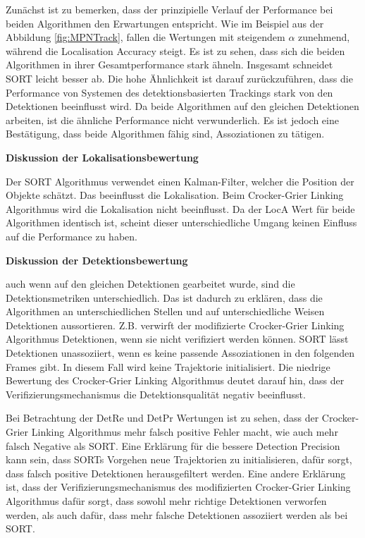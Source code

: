Zunächst ist zu bemerken, dass der prinzipielle Verlauf der Performance bei beiden Algorithmen den Erwartungen entspricht. Wie im Beispiel aus der Abbildung \ref{fig:MPNTrack}, fallen die Wertungen mit steigendem \(\alpha\) zunehmend, während die Localisation Accuracy steigt. Es ist zu sehen, dass sich die beiden Algorithmen in ihrer Gesamtperformance stark ähneln. Insgesamt schneidet SORT leicht besser ab. Die hohe Ähnlichkeit ist darauf zurückzuführen, dass die Performance von Systemen des detektionsbasierten Trackings stark von den Detektionen beeinflusst wird. Da beide Algorithmen auf den gleichen Detektionen arbeiten, ist die ähnliche Performance nicht verwunderlich. Es ist jedoch eine Bestätigung, dass beide Algorithmen fähig sind, Assoziationen zu tätigen.\dubpar

\textbf{Diskussion der Lokalisationsbewertung}\par
Der SORT Algorithmus verwendet einen Kalman-Filter, welcher die Position der Objekte schätzt. Das beeinflusst die Lokalisation. Beim Crocker-Grier Linking Algorithmus wird die Lokalisation nicht beeinflusst. Da der LocA Wert für beide Algorithmen identisch ist, scheint dieser unterschiedliche Umgang keinen Einfluss auf die Performance zu haben.\dubpar

\textbf{Diskussion der Detektionsbewertung}\par
auch wenn auf den gleichen Detektionen gearbeitet wurde, sind die Detektionsmetriken unterschiedlich. Das ist dadurch zu erklären, dass die Algorithmen an unterschiedlichen Stellen und auf unterschiedliche Weisen Detektionen aussortieren. Z.B. verwirft der modifizierte Crocker-Grier Linking Algorithmus Detektionen, wenn sie nicht verifiziert werden können. SORT lässt Detektionen unassoziiert, wenn es keine passende Assoziationen in den folgenden Frames gibt. In diesem Fall wird keine Trajektorie initialisiert. Die niedrige Bewertung des Crocker-Grier Linking Algorithmus deutet darauf hin, dass der Verifizierungsmechanismus die Detektionsqualität negativ beeinflusst. \par

Bei Betrachtung der DetRe und DetPr Wertungen ist zu sehen, dass der Crocker-Grier Linking Algorithmus mehr falsch positive Fehler macht, wie auch mehr falsch Negative als SORT. Eine Erklärung für die bessere Detection Precision kann sein, dass SORTs Vorgehen neue Trajektorien zu initialisieren, dafür sorgt, dass falsch positive Detektionen herausgefiltert werden. Eine andere Erklärung ist, dass der Verifizierungsmechanismus des modifizierten Crocker-Grier Linking Algorithmus dafür sorgt, dass sowohl mehr richtige Detektionen verworfen werden, als auch dafür, dass mehr falsche Detektionen assoziiert werden als bei SORT. \par

